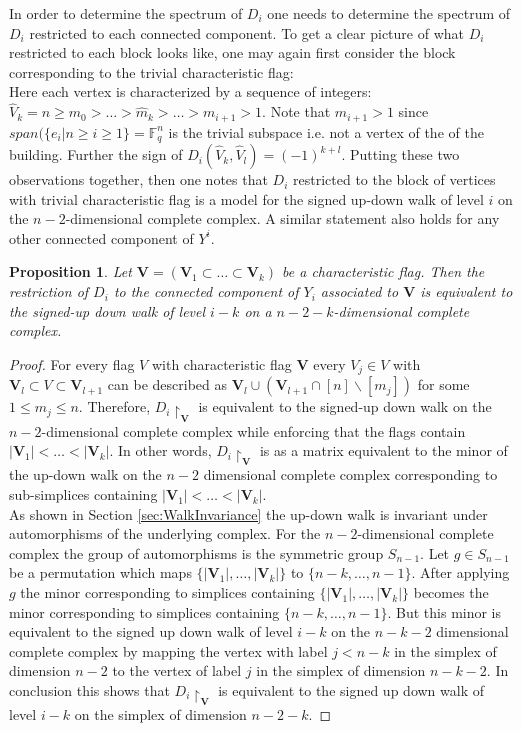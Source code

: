 \documentclass[11pt]{amsart}
\newtheorem{proposition}[theorem]{Proposition}
\begin{document}
    In order to determine the spectrum of $D_i$ one needs to determine the spectrum of $D_i$ restricted to each connected component. To get a clear picture of what $D_i$ restricted to each block looks like, one may again first consider the block corresponding to the trivial characteristic flag:\\
    Here each vertex is characterized by a sequence of integers: $\hat{V}_k=n\geq m_0>\dots>\hat{m}_k>\dots>m_{i+1}>1$. Note that $m_{i+1}>1$ since $span(\{e_i|n\geq i\geq 1\}=\mathbb{F}_q^n$ is the trivial subspace i.e. not a vertex of the of the building. Further the sign of $D_i(\hat{V}_k,\hat{V}_l)=(-1)^{k+l}$. Putting these two observations together, then one notes that $D_i$ restricted to the block of vertices with trivial characteristic flag is a model for the signed up-down walk of level $i$ on the $n-2$-dimensional complete complex. A similar statement also holds for any other connected component of $Y^i$.
    \begin{proposition}
        Let $\mathbf{V}=(\mathbf{V}_1\subset\dots\subset\mathbf{V}_k)$ be a characteristic flag. Then the restriction of $D_i$ to the connected component of $Y_i$ associated to $\mathbf{V}$ is equivalent to the signed-up down walk of level $i-k$ on a $n-2-k$-dimensional complete complex.
        \label{prop:BlockSimplex}
    \end{proposition}
    \begin{proof}
        For every flag $V$ with characteristic flag $\mathbf{V}$ every $V_j\in V$ with $\mathbf{V}_l\subset V\subset \mathbf{V}_{l+1}$ can be described as $\mathbf{V}_l\cup(\mathbf{V}_{l+1}\cap [n]\backslash[m_j])$ for some $1\leq m_j\leq n$. Therefore, $D_i\restriction_{\mathbf{V}}$ is equivalent to the signed-up down walk on the $n-2$-dimensional complete complex while enforcing that the flags contain $|\mathbf{V}_1|<\dots<|\mathbf{V}_k|$. In other words, $D_i\restriction_{\mathbf{V}}$ is as a matrix equivalent to the minor of the up-down walk on the $n-2$ dimensional complete complex corresponding to sub-simplices containing $|\mathbf{V}_1|<\dots<|\mathbf{V}_k|$.\\
        As shown in Section \ref{sec:WalkInvariance} the up-down walk is invariant under automorphisms of the underlying complex. For the $n-2$-dimensional complete complex the group of automorphisms is the symmetric group $S_{n-1}$. Let $g\in S_{n-1}$ be a permutation which maps $\{|\mathbf{V}_1|,\dots,|\mathbf{V}_k|\}$ to $\{n-k,\dots,n-1\}$. After applying $g$ the minor corresponding to simplices containing $\{|\mathbf{V}_1|,\dots,|\mathbf{V}_k|\}$ becomes the minor corresponding to simplices  containing $\{n-k,\dots,n-1\}$. But this minor is equivalent to the signed up down walk of level $i-k$ on the $n-k-2$ dimensional complete complex by mapping the vertex with label $j<n-k$ in the simplex of dimension $n-2$ to the vertex of label $j$ in the simplex of dimension $n-k-2$. In conclusion this shows that $D_i\restriction_{\mathbf{V}}$ is equivalent to the signed up down walk of level $i-k$ on the simplex of dimension $n-2-k$.
    \end{proof}
\end{document}
